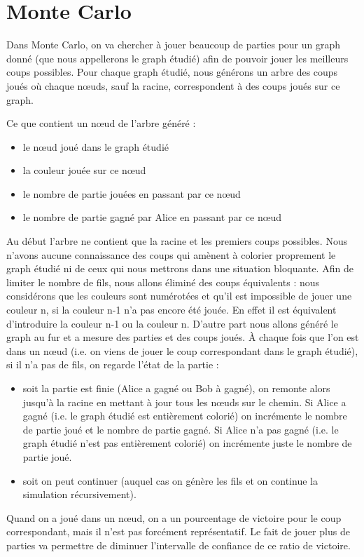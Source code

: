 \section{Monte Carlo}
Dans Monte Carlo, on va chercher à jouer beaucoup de parties pour un graph donné (que nous appellerons le graph étudié) afin de pouvoir jouer les meilleurs coups possibles.
 Pour chaque graph étudié, nous générons un arbre des coups joués où chaque nœuds, sauf la racine, correspondent à des coups joués sur ce graph. 

Ce que contient un nœud de l’arbre généré : 
\begin{itemize}
\item le nœud joué dans le graph étudié
\item la couleur jouée sur ce nœud 
\item le nombre de partie jouées en passant par ce nœud 
\item le nombre de partie gagné par Alice en passant par ce nœud
\end{itemize}

Au début l’arbre ne contient que la racine et les premiers coups possibles. Nous n’avons aucune connaissance des coups qui amènent à colorier proprement le graph étudié ni de ceux qui nous mettrons  dans une situation bloquante. 
Afin de limiter le nombre de fils, nous allons éliminé des coups équivalents : nous considérons que les couleurs sont numérotées et qu’il est impossible de jouer une couleur n, si la couleur n-1 n’a pas encore été jouée. En effet il est équivalent d’introduire la couleur n-1 ou la couleur n. 
D’autre part nous allons généré le graph au fur et a mesure des parties et des coups joués. À chaque fois que l’on est dans un nœud (i.e. on viens de jouer le coup correspondant dans le graph étudié), si il n’a pas de fils, on regarde l'état de la partie : 
\begin{itemize}\item soit la partie est finie (Alice a gagné ou Bob à gagné), on remonte alors jusqu’à la racine en mettant à jour tous les nœuds sur le chemin. Si Alice a gagné (i.e. le graph étudié est entièrement colorié) on incrémente le nombre de partie joué et le nombre de partie gagné. Si Alice n’a pas gagné (i.e. le graph étudié n’est pas entièrement colorié)  on incrémente juste le nombre de partie joué.\item soit on peut continuer (auquel cas on génère les fils et on continue la simulation récursivement).
\end{itemize}
Quand on a joué dans un nœud, on a un pourcentage de victoire pour le coup correspondant, mais il n’est pas forcément représentatif. Le fait de jouer plus de parties va permettre de diminuer l'intervalle de confiance de ce ratio de victoire.


